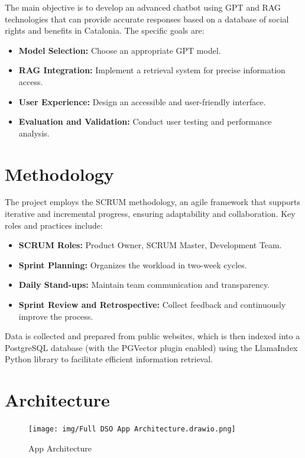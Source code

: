 \documentclass[a4paper,12pt,oneside]{ThesisStyle}
\begin{document}
The main objective is to develop an advanced chatbot using GPT and RAG technologies that can provide accurate responses based on a database of social rights and benefits in Catalonia. The specific goals are:

\begin{itemize}
    \item \textbf{Model Selection:} Choose an appropriate GPT model.
    \item \textbf{RAG Integration:} Implement a retrieval system for precise information access.
    \item \textbf{User Experience:} Design an accessible and user-friendly interface.
    \item \textbf{Evaluation and Validation:} Conduct user testing and performance analysis.
\end{itemize}

\section{Methodology}
\label{sec:methodology}

The project employs the SCRUM methodology, an agile framework that supports iterative and incremental progress, ensuring adaptability and collaboration. Key roles and practices include:

\begin{itemize}
    \item \textbf{SCRUM Roles:} Product Owner, SCRUM Master, Development Team.
    \item \textbf{Sprint Planning:} Organizes the workload in two-week cycles.
    \item \textbf{Daily Stand-ups:} Maintain team communication and transparency.
    \item \textbf{Sprint Review and Retrospective:} Collect feedback and continuously improve the process.
\end{itemize}

Data is collected and prepared from public websites, which is then indexed into a PostgreSQL database (with the PGVector plugin enabled) using the LlamaIndex Python library to facilitate efficient information retrieval.

\section{Architecture}
\label{sec:architecture}

\begin{figure}[h]
  \centering
  \texttt{[image: img/Full DSO App Architecture.drawio.png]}
  \caption{App Architecture}
  \label{fig:architecture}
\end{figure}
\end{document}
